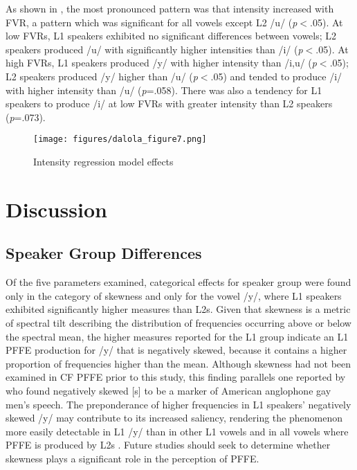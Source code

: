 \documentclass[output=paper,colorlinks,citecolor=brown,draftmode]{langscibook}
\begin{document}
As shown in , the most pronounced pattern was that intensity increased with FVR, a pattern which was significant for all vowels except L2 /u/ (\emph{p}$<$.05).  At low FVRs, L1 speakers exhibited no significant differences between vowels; L2 speakers produced /u/ with significantly higher intensities than /i/ (\emph{p}$<$.05). At high FVRs, L1 speakers produced /y/ with higher intensity than /i,u/ (\emph{p}$<$.05); L2 speakers produced /y/ higher than /u/ (\emph{p}$<$.05) and tended to produce /i/ with higher intensity than /u/ (\emph{p}=.058). There was also a tendency for L1 speakers to produce /i/ at low FVRs with greater intensity than L2 speakers (\emph{p}=.073).

\begin{figure}
    \texttt{[image: figures/dalola\_figure7.png]}
    \caption{Intensity regression model effects}
    \label{figure7}
\end{figure}

\section{Discussion}
\subsection{Speaker Group Differences}
Of the five parameters examined, categorical effects for speaker group were found only in the category of skewness and only for the vowel /y/, where L1 speakers exhibited significantly higher measures than L2s. Given that skewness is a metric of spectral tilt describing the distribution of frequencies occurring above or below the spectral mean, the higher measures reported for the L1 group indicate an L1 PFFE production for /y/ that is negatively skewed, because it contains a higher proportion of frequencies higher than the mean. Although skewness had not been examined in CF PFFE prior to this study, this finding parallels one reported by \citet{munson2006acoustic} who found negatively skewed [s] to be a marker of American anglophone gay men’s speech. The preponderance of higher frequencies in L1 speakers’ negatively skewed /y/ may contribute to its increased saliency, rendering the phenomenon more easily detectable in L1 /y/ than in other L1 vowels and in all vowels where PFFE is produced by L2s . Future studies should seek to determine whether skewness plays a significant role in the perception of PFFE.
\end{document}
